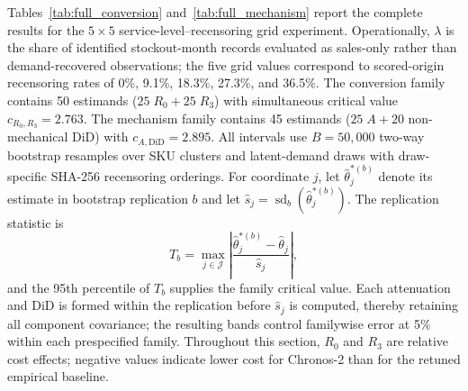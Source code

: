 \documentclass[msom,dblanonrev]{informs4}
\begin{document}
Tables~\ref{tab:full_conversion} and~\ref{tab:full_mechanism} report the complete results for the $5\times 5$ service-level--recensoring grid experiment.
Operationally, $\lambda$ is the share of identified stockout-month records evaluated as sales-only rather than demand-recovered observations; the five grid values correspond to scored-origin recensoring rates of 0\%, 9.1\%, 18.3\%, 27.3\%, and 36.5\%.
The conversion family contains 50 estimands ($25\;R_0+25\;R_3$) with simultaneous critical value $c_{R_0,R_3}=2.763$.
The mechanism family contains 45 estimands ($25\;A+20$ non-mechanical $\mathrm{DiD}$) with $c_{A,\mathrm{DiD}}=2.895$.
All intervals use $B=50{,}000$ two-way bootstrap resamples over SKU clusters and latent-demand draws with draw-specific SHA-256 recensoring orderings.
For coordinate $j$, let $\widehat\theta_j^{*(b)}$ denote its estimate in bootstrap replication $b$ and let $\widehat s_j=\operatorname{sd}_b(\widehat\theta_j^{*(b)})$.
The replication statistic is
\[
T_b=\max_{j\in\mathcal J}
\left|\frac{\widehat\theta_j^{*(b)}-\widehat\theta_j}{\widehat s_j}\right|,
\]
and the 95th percentile of $T_b$ supplies the family critical value.
Each attenuation and DiD is formed within the replication before $\widehat s_j$ is computed, thereby retaining all component covariance; the resulting bands control familywise error at 5\% within each prespecified family.
Throughout this section, $R_0$ and $R_3$ are relative cost effects; negative values indicate lower cost for Chronos-2 than for the retuned empirical baseline.
\end{document}
